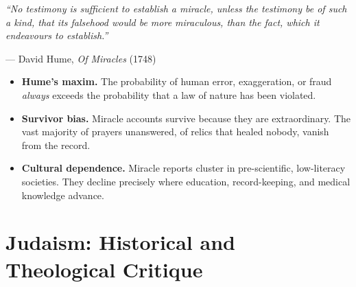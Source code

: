 \documentclass[11pt,twoside]{article}
\begin{document}
\begin{scheda}

\begin{citazione}
\textit{``No testimony is sufficient to establish a miracle, unless the
testimony be of such a kind, that its falsehood would be more miraculous,
than the fact, which it endeavours to establish.''}

\medskip
\hfill--- David Hume, \textit{Of Miracles} (1748)
\end{citazione}

\begin{itemize}
  \item \textbf{Hume's maxim.}
    The probability of human error, exaggeration, or fraud \emph{always}
    exceeds the probability that a law of nature has been violated.
  \item \textbf{Survivor bias.}
    Miracle accounts survive because they are extraordinary.  The vast
    majority of prayers unanswered, of relics that healed nobody, vanish
    from the record.
  \item \textbf{Cultural dependence.}
    Miracle reports cluster in pre-scientific, low-literacy societies.
    They decline precisely where education, record-keeping, and medical
    knowledge advance.
\end{itemize}
\end{scheda}

\newpage

\section{Judaism: Historical and Theological Critique}
\end{document}
